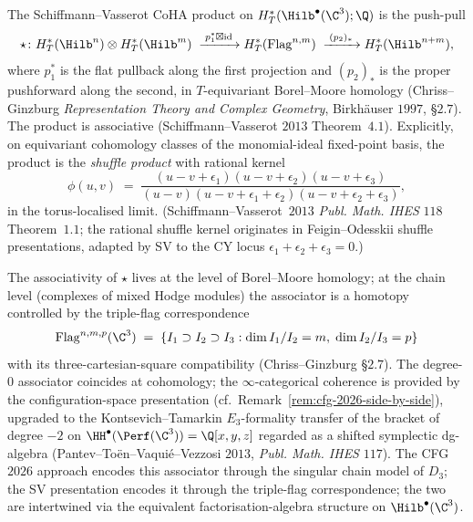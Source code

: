\begin{definition}
\label{def:coha-product-c3}
\ClaimStatusDefinitional
The Schiffmann--Vasserot CoHA product on
$H^*_T(\Hilb^\bullet(\C^3); \Q)$ is the push-pull
\[
 \star \colon H^*_T(\Hilb^n) \otimes H^*_T(\Hilb^m)
 \;\xrightarrow{\;p_1^* \boxtimes \mathrm{id}\;}
 H^*_T(\mathrm{Flag}^{n, m})
 \;\xrightarrow{\;(p_2)_*\;}
 H^*_T(\Hilb^{n + m}),
\]
where $p_1^*$ is the flat pullback along the first projection and
$(p_2)_*$ is the proper pushforward along the second, in
$T$-equivariant Borel--Moore homology (Chriss--Ginzburg
\textit{Representation Theory and Complex Geometry}, Birkh\"auser
$1997$, \S$2.7$). The product is associative (Schiffmann--Vasserot
$2013$ Theorem~$4.1$). Explicitly, on equivariant cohomology classes
of the monomial-ideal fixed-point basis, the product is the
\emph{shuffle product} with rational kernel
\[
 \phi(u, v) \;=\; \frac{(u - v + \epsilon_1)(u - v + \epsilon_2)
 (u - v + \epsilon_3)}{(u - v)(u - v + \epsilon_1 + \epsilon_2)
 (u - v + \epsilon_2 + \epsilon_3)},
\]
in the torus-localised limit. (Schiffmann--Vasserot~$2013$
\textit{Publ. Math. IHES} $118$ Theorem~$1.1$; the rational shuffle
kernel originates in Feigin--Odesskii shuffle presentations, adapted
by SV to the CY locus $\epsilon_1 + \epsilon_2 + \epsilon_3 = 0$.)
\end{definition}

\begin{remark}
\label{rem:coha-associativity-class}
The associativity of $\star$ lives at the level of Borel--Moore
homology; at the chain level (complexes of mixed Hodge modules) the
associator is a homotopy controlled by the triple-flag correspondence
\[
 \mathrm{Flag}^{n, m, p}(\C^3)
 \;=\; \{I_1 \supset I_2 \supset I_3 : \dim I_1 / I_2 = m,\;
 \dim I_2 / I_3 = p\}
\]
with its three-cartesian-square compatibility (Chriss--Ginzburg
\S$2.7$). The degree-$0$ associator coincides at cohomology; the
$\infty$-categorical coherence is provided by the configuration-space
presentation (cf.~Remark~\ref{rem:cfg-2026-side-by-side}), upgraded to
the Kontsevich--Tamarkin $E_3$-formality transfer of the bracket of
degree $-2$ on $\HH^\bullet(\Perf(\C^3)) = \Q[x, y, z]$ regarded as a
shifted symplectic dg-algebra (Pantev--To\"en--Vaqui\'e--Vezzosi
$2013$, \textit{Publ. Math. IHES} $117$). The CFG $2026$ approach
encodes this associator through the singular chain model of $D_3$;
the SV presentation encodes it through the triple-flag correspondence;
the two are intertwined via the equivalent factorisation-algebra
structure on $\Hilb^\bullet(\C^3)$.
\end{remark}

